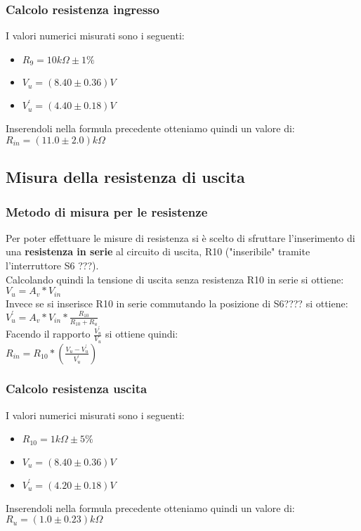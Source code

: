 \documentclass{article}
\begin{document}
\subsubsection{Calcolo resistenza ingresso}
I valori numerici misurati sono i seguenti:
\begin{itemize}
	\item \large $R_{9} = 10k\Omega \pm 1\%$
	\item \large $V_{u} = (8.40 \pm 0.36)V$
	\item \large $V_{u}^{'} = (4.40 \pm 0.18)V$
\end{itemize}
Inserendoli nella formula precedente otteniamo quindi un valore di: \\ \large $R_{in} = (11.0 \pm 2.0)k\Omega$

\subsection{Misura della resistenza di uscita}
\subsubsection{Metodo di misura per le resistenze}
Per poter effettuare le misure di resistenza si è scelto di sfruttare l'inserimento di una \textbf{resistenza in serie} al circuito di uscita, R10 ("inseribile" tramite l'interruttore S6 ???).\\Calcolando quindi la tensione di uscita senza resistenza R10 in serie si ottiene:\\
\large $V_{u} = A_{v} * V_{in}$ \normalsize \\ Invece se si inserisce R10 in serie commutando la posizione di S6???? si ottiene:\\
\large $ V_{u}^{'} = A_{v} * V_{in} * \frac{R_{10}}{R_{10} + R_u} $ \normalsize \\ Facendo il rapporto \large $\frac{V_{u}^{'}}{{V_u}}$ \normalsize si ottiene quindi: \\ \large $R_{in} = R_{10} * (\frac{V_{u}-V_{u}^{'}}{V_{u}^{'}}) $ \normalsize
\subsubsection{Calcolo resistenza uscita}
I valori numerici misurati sono i seguenti:
\begin{itemize}
	\item \large $R_{10} = 1k\Omega \pm 5\%$
	\item \large $V_{u} = (8.40 \pm 0.36)V$
	\item \large $V_{u}^{'} = (4.20 \pm 0.18)V$
\end{itemize}
Inserendoli nella formula precedente otteniamo quindi un valore di: \\ \large $R_{u} = (1.0 \pm 0.23)k\Omega$
\end{document}
